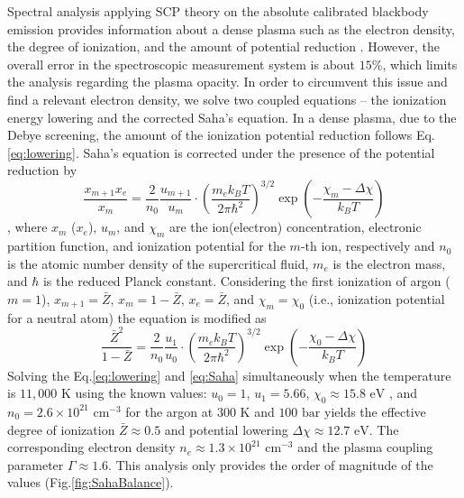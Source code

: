 Spectral analysis applying SCP theory on the absolute calibrated blackbody emission provides information about a dense plasma such as the electron density, the degree of ionization, and the amount of potential reduction \cite{bataller2014blackbody}. However, the overall error in the spectroscopic measurement system is about $15\%$, which limits the analysis regarding the plasma opacity. In order to circumvent this issue and find a relevant electron density, we solve two coupled equations – the ionization energy lowering and the corrected Saha’s equation. In a dense plasma, due to the Debye screening, the amount of the ionization potential reduction follows Eq.\ref{eq:lowering}. Saha’s equation is corrected under the presence of the potential reduction by 
\begin{equation}
\frac{x_{m+1} x_{e}}{x_{m}}=\frac{2}{n_{0}} \frac{u_{m+1}}{u_{m}} \cdot\left(\frac{m_{e} k_{B} T}{2 \pi \hbar^{2}}\right)^{3 / 2} \exp \left(-\frac{\chi_{m}-\Delta \chi}{k_{B} T}\right)
\end{equation}
, where $x_m$ ($x_e$), $u_m$, and $χ_m$ are the ion(electron) concentration, electronic partition function, and ionization potential for the $m\text{-th}$ ion, respectively \cite{bataller2014blackbody, griem1962high, zel2002physics} and $n_0$ is the atomic number density of the supercritical fluid, $m_e$ is the electron mass, and $\hbar$ is the reduced Planck constant. Considering the first ionization of argon ($m=1$), $x_{m+1}=\bar{Z}$, $x_m=1-\bar{Z}$, $x_e=\bar{Z}$, and $\chi_m=\chi_0$ (i.e., ionization potential for a neutral atom) the equation is modified as 
\begin{equation}
\frac{\bar{Z}^{2}}{1-\bar{Z}}=\frac{2}{n_{0}} \frac{u_{1}}{u_{0}} \cdot\left(\frac{m_{e} k_{B} T}{2 \pi \hbar^{2}}\right)^{3 / 2} \exp \left(-\frac{\chi_{0}-\Delta \chi}{k_{B} T}\right)
\label{eq:Saha}
\end{equation}
Solving the Eq.\ref{eq:lowering} and \ref{eq:Saha} simultaneously when the temperature is $11,000 \text{ K}$ using the known values: $u_0=1$, $u_1=5.66$, $\chi_0 \approx 15.8 \text{ eV}$ \cite{kramida2020nist}, and $n_0 = 2.6 \times 10^{21}  \text{ cm}^{-3}$ for the argon at $300 \text{ K}$ and $100 \text{ bar}$ \cite{linstorm2020nist} yields the effective degree of ionization $\bar{Z} \approx 0.5$ and potential lowering $\Delta \chi \approx 12.7 \text{ eV}$. The corresponding electron density $n_e \approx 1.3 \times 10^{21} \text{ cm}^{-3}$ and the plasma coupling parameter $\Gamma \approx 1.6$. This analysis only provides the order of magnitude of the values (Fig.\ref{fig:SahaBalance}).




